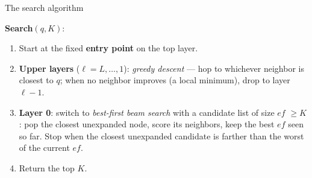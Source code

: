 \documentclass[aspectratio=169,12pt]{beamer}
\begin{document}
\begin{frame}{The search algorithm}

\textbf{Search}$(q, K)$:
\begin{enumerate}\setlength\itemsep{2pt}
  \item Start at the fixed \textbf{entry point} on the top layer.
  \item \textbf{Upper layers} ($\ell = L,\ldots,1$): \emph{greedy descent} --- hop to whichever
    neighbor is closest to $q$; when no neighbor improves (a local minimum), drop to layer $\ell-1$.
  \item \textbf{Layer 0}: switch to \emph{best-first beam search} with a candidate list of size
    \textcolor{key}{$\mathit{ef}$} $\geq K$: pop the closest unexpanded node, score its neighbors,
    keep the best $\mathit{ef}$ seen so far. Stop when the closest unexpanded candidate is farther
    than the worst of the current $\mathit{ef}$.
  \item Return the top $K$.
\end{enumerate}

\vspace{4pt}

\vspace{4pt}
\end{frame}
\end{document}
